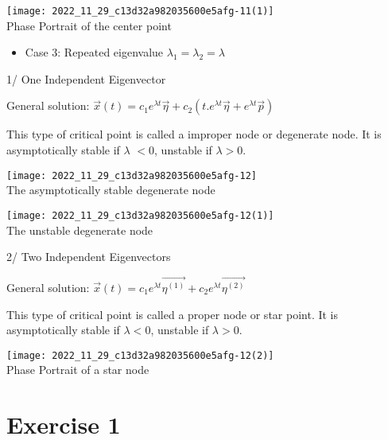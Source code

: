 \documentclass[a4paper]{article}
\begin{document}
\begin{center}
	\texttt{[image: 2022\_11\_29\_c13d32a982035600e5afg-11(1)]}\\
	Phase Portrait of the center point
\end{center}



\begin{itemize}
	\item Case 3: Repeated eigenvalue $\lambda_{1}=\lambda_{2}=\lambda$
\end{itemize}

1/ One Independent Eigenvector

General solution: $\vec{x}(t)=c_{1} e^{\lambda t} \vec{\eta}+c_{2}\left(t . e^{\lambda t} \vec{\eta}+e^{\lambda t} \vec{p}\right)$

This type of critical point is called a improper node or degenerate node. It is asymptotically stable if $\lambda$ $<0$, unstable if $\lambda>0$.

\begin{center}
	\texttt{[image: 2022\_11\_29\_c13d32a982035600e5afg-12]}\\
	The asymptotically stable degenerate node
\end{center}



\begin{center}
	\texttt{[image: 2022\_11\_29\_c13d32a982035600e5afg-12(1)]}\\
	The unstable degenerate node
\end{center}



2/ Two Independent Eigenvectors

General solution: $\vec{x}(t)=c_{1} e^{\lambda t} \overrightarrow{\eta^{(1)}}+c_{2} e^{\lambda t} \overrightarrow{\eta^{(2)}}$

This type of critical point is called a proper node or star point. It is asymptotically stable if $\lambda<0$, unstable if $\lambda>0$.

\begin{center}
	\texttt{[image: 2022\_11\_29\_c13d32a982035600e5afg-12(2)]}\\
	Phase Portrait of a star node
\end{center}


\section{Exercise 1}
\end{document}
